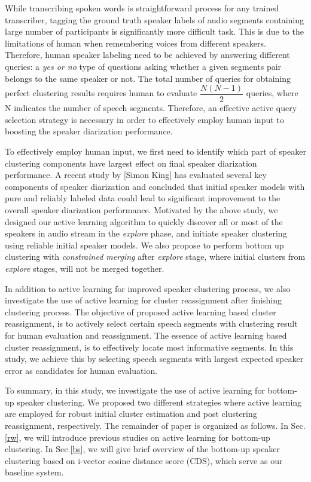 \documentclass[journal]{IEEEtran}
\begin{document}
While transcribing spoken words is straightforward process for any trained transcriber, tagging the ground truth speaker labels of audio segments containing large number of participants is significantly more difficult task. This is due to the limitations of human when remembering voices from different speakers. Therefore, human speaker labeling need to be achieved by answering different queries: a \textit{yes or no} type of questions asking whether a given segments pair belongs to the same speaker or not. The total number of queries for obtaining perfect clustering results requires human to evaluate $\dfrac{N(N-1)}{2}$ queries, where N indicates the number of speech segments. Therefore, an effective active query selection strategy is necessary in order to effectively employ human input to boosting the speaker diarization performance. 

To effectively employ human input, we first need to identify which part of speaker clustering components have largest effect on final speaker diarization performance. A recent study by [Simon King] has evaluated several key components of speaker diarization and concluded that initial speaker models with pure and reliably labeled data could lead to significant improvement to the overall speaker diarization performance.  Motivated by the above study, we designed our active learning algorithm to quickly discover all or most of the speakers in audio stream in the \textit{explore} phase, and initiate speaker clustering using reliable initial speaker models. We also propose to perform bottom up clustering with \textit{constrained merging} after \textit{explore} stage, where initial clusters from \textit{explore} stages, will not be merged together. 

In addition to active learning for improved speaker clustering process, we also investigate the use of active learning for cluster reassignment after finishing clustering process. The objective of proposed active learning based cluster reassignment, is to actively select certain speech segments with clustering result for human evaluation and reassignment. The essence of active learning based cluster reassignment, is to effectively locate most informative segments. In this study, we achieve this by selecting speech segments with largest expected speaker error as candidates for human evaluation.

To summary, in this study, we investigate the use of active learning for bottom-up speaker clustering. We proposed two different strategies where active learning are employed for robust initial cluster estimation and post clustering reassignment, respectively. The remainder of paper is organized as follows. In Sec.\ref{rw}, we will introduce previous studies on active learning for bottom-up clustering. In Sec.\ref{bs}, we will give brief overview of the bottom-up speaker clustering based on i-vector cosine distance score (CDS), which serve as our baseline system.   
\end{document}
